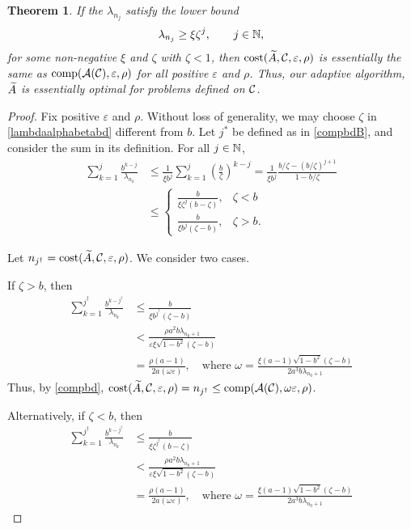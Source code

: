 \documentclass[final]{elsarticle}
\newtheorem{theorem}{Theorem}
\theoremstyle{definition}
\theoremstyle{remark}
\begin{document}
\begin{theorem}
If the $\lambda_{n_j}$ satisfy the lower bound
\begin{equation} \label{lambdaalphabetabd}
\lambda_{n_j} \ge \xi \zeta^{j}, \qquad j \in \mathbb{N},
\end{equation}
for some non-negative $\xi$ and $\zeta$ with $\zeta < 1$, then $\operatorname{cost}(\widetilde{A},\mathcal{C},\varepsilon,\rho)$ is essentially the same as $\operatorname{comp}(\mathcal{A}(\mathcal{C}),\varepsilon,\rho)$ for all positive $\varepsilon$ and $\rho$.  Thus, our adaptive algorithm, $\widetilde{A}$ is essentially optimal for problems defined on $\mathcal{C}$.
\end{theorem}
\begin{proof}  Fix positive $\varepsilon$ and $\rho$.  Without loss of generality, we may choose $\zeta$ in \eqref{lambdaalphabetabd} different from $b$.  Let $j^*$ be defined as in \eqref{compbdB}, and consider the sum in its definition.  For all $j \in \mathbb{N}$, 
\begin{align*}
\sum_{k=1}^j \frac{b^{k-j}}{\lambda_{n_{k}}}
& \le 
\frac{1}{\xi b^j} \sum_{k=1}^j \left(\frac{b}{\zeta} \right)^{k-j} 
= 
\frac{1}{\xi b^j} \frac{b/\zeta - (b/\zeta)^{j+1}}{1 - b/\zeta}
\\
&\le
\begin{cases}
\displaystyle 
\frac{b}{\xi \zeta^{j}(b -  \zeta)},
& \zeta < b
\\
\displaystyle 
\frac{b}{\xi b^{j}(\zeta - b)}, & \zeta > b.
\end{cases}
\end{align*}

Let $n_{j^\dagger} = \operatorname{cost}(\widetilde{A},\mathcal{C},\varepsilon,\rho)$.  We consider two cases.

If $\zeta > b$, then 
\begin{align*}
\sum_{k=1}^{j^\dagger} \frac{b^{k-j^\dagger}}{\lambda_{n_{k}}}
& \le \frac{b}{\xi b^{j^\dagger}(\zeta - b)} \\ 
& < \frac{\rho a^2 b \lambda_{n_0+1}}{\varepsilon \xi \sqrt{1-b^2}(\zeta - b) } \\
& = \frac{\rho (a-1)}{2 a (\omega\varepsilon)}, \quad \text{where } \omega = \frac{\xi (a-1)\sqrt{1-b^2}(\zeta - b)}{2a^3b \lambda_{n_0+1}}  
\end{align*}
Thus, by \eqref{compbd}, $\operatorname{cost}(\widetilde{A},\mathcal{C},\varepsilon,\rho) = n_{j^\dagger} \le \operatorname{comp}(\mathcal{A}(\mathcal{C}),\omega \varepsilon,\rho)$.

Alternatively, if $\zeta < b$, then 
\begin{align*}
\sum_{k=1}^{j^\dagger} \frac{b^{k-j^\dagger}}{\lambda_{n_{k}}}
& \le \frac{b}{\xi \zeta^{j^\dagger}(b - \zeta)} \\ 
& < \frac{\rho a^2 b \lambda_{n_0+1}}{\varepsilon \xi \sqrt{1-b^2}(\zeta - b) } \\
& = \frac{\rho (a-1)}{2 a (\omega\varepsilon)}, \quad \text{where } \omega = \frac{\xi (a-1)\sqrt{1-b^2}(\zeta - b)}{2a^3b \lambda_{n_0+1}}  
\end{align*}

\end{proof}
\end{document}
